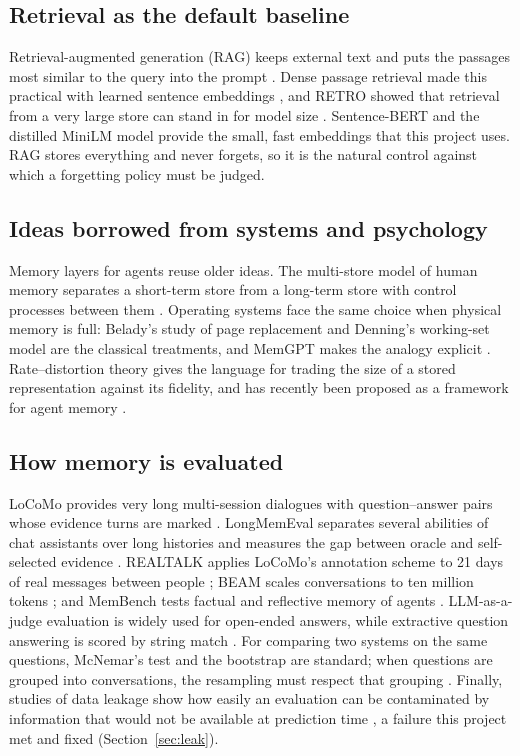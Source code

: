 \subsection{Retrieval as the default baseline}
Retrieval-augmented generation (RAG) keeps external text and puts the passages
most similar to the query into the prompt \cite{lewis2020rag}. Dense passage
retrieval made this practical with learned sentence embeddings
\cite{karpukhin2020dpr}, and RETRO showed that retrieval from a very large
store can stand in for model size \cite{borgeaud2022retro}. Sentence-BERT
\cite{reimers2019sbert} and the distilled MiniLM model \cite{wang2020minilm}
provide the small, fast embeddings that this project uses. RAG stores
everything and never forgets, so it is the natural control against which a
forgetting policy must be judged.

\subsection{Ideas borrowed from systems and psychology}
Memory layers for agents reuse older ideas. The multi-store model of human
memory separates a short-term store from a long-term store with control
processes between them \cite{atkinson1968memory}. Operating systems face the
same choice when physical memory is full: Belady's study of page replacement
\cite{belady1966replacement} and Denning's working-set model
\cite{denning1968workingset} are the classical treatments, and MemGPT makes
the analogy explicit \cite{packer2023memgpt}. Rate--distortion theory
\cite{shannon1959rd,cover2006elements} gives the language for trading the size
of a stored representation against its fidelity, and has recently been
proposed as a framework for agent memory \cite{colaco2026rd}.

\subsection{How memory is evaluated}
LoCoMo provides very long multi-session dialogues with question--answer pairs
whose evidence turns are marked \cite{maharana2024locomo}. LongMemEval
separates several abilities of chat assistants over long histories and
measures the gap between oracle and self-selected evidence
\cite{wu2024longmemeval}. REALTALK applies LoCoMo's annotation scheme to 21 days
of real messages between people \cite{lee2025realtalk}; BEAM scales
conversations to ten million tokens \cite{tavakoli2026beam}; and MemBench
tests factual and reflective memory of agents \cite{tan2025membench}.
LLM-as-a-judge evaluation \cite{zheng2023judge} is widely used for open-ended
answers, while extractive question answering is scored by string match
\cite{rajpurkar2016squad}. For comparing two systems on the same questions,
McNemar's test \cite{mcnemar1947,dietterich1998tests} and the bootstrap
\cite{efron1993bootstrap} are standard; when questions are grouped into
conversations, the resampling must respect that grouping
\cite{cameron2008cluster}. Finally, studies of data leakage show how easily an
evaluation can be contaminated by information that would not be available at
prediction time \cite{kaufman2012leakage,kapoor2023leakage}, a failure this
project met and fixed (Section~\ref{sec:leak}).

